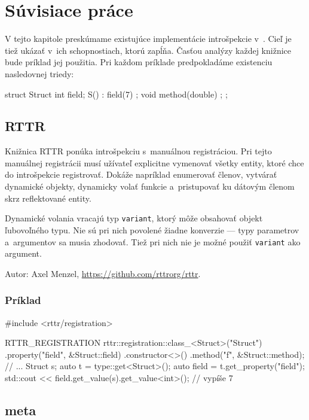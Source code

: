\chapter{Súvisiace práce} \label{suvisiace}

V tejto kapitole preskúmame existujúce implementácie introšpekcie v~\Cpp{}. Cieľ je tiež ukázať  v~ich schopnostiach, ktorú \PPreflection{} zapĺňa. Časťou analýzy každej knižnice bude príklad jej použitia. Pri každom príklade predpokladáme existenciu nasledovnej triedy:

\begin{code}
struct Struct {
    int field;
    S() : field(7) {};
    void method(double) {};
};
\end{code}

\section{\textsf{RTTR}}

Knižnica \textsf{RTTR} ponúka introšpekciu s~manuálnou registráciou. Pri tejto manuálnej registrácii musí užívateľ explicitne vymenovať všetky entity, ktoré chce do introšpekcie registrovať. Dokáže napríklad enumerovať členov, vytvárať dynamické objekty, dynamicky volať funkcie a~pristupovať ku dátovým členom skrz reflektované entity.

Dynamické volania vracajú typ \texttt{variant}, ktorý môže obsahovať objekt ľubovoľného typu. Nie sú pri nich povolené žiadne konverzie --- typy parametrov a~argumentov sa musia zhodovať. Tiež pri nich nie je možné použiť \texttt{variant} ako argument.

Autor: Axel Menzel, \url{https://github.com/rttrorg/rttr}.

\subsection*{Príklad}

\begin{code}
#include <rttr/registration>

RTTR_REGISTRATION
{   rttr::registration::class_<Struct>("Struct")
         .property("field", &Struct::field)
         .constructor<>()
         .method("f", &Struct::method);
}
// ...
Struct s;
auto t = type::get<Struct>();
auto field = t.get_property("field");
std::cout << field.get_value(s).get_value<int>(); // vypíše 7
\end{code}

\section{\textsf{meta}}

